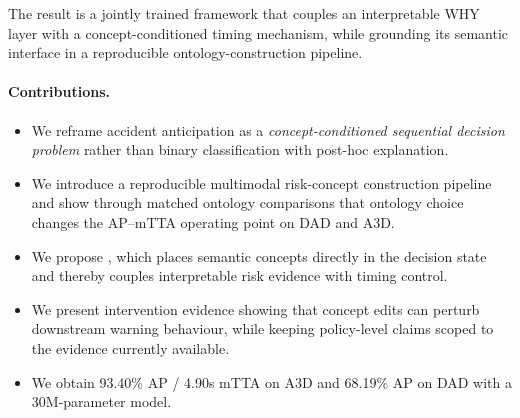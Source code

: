 The result is a jointly trained framework that couples an interpretable WHY
layer with a concept-conditioned timing mechanism, while grounding its semantic
interface in a reproducible ontology-construction pipeline.

\paragraph{Contributions.}
\begin{itemize}[leftmargin=1.4em,topsep=2pt,itemsep=1pt]
  \item We reframe accident anticipation as a \emph{concept-conditioned sequential decision problem} rather than binary classification with post-hoc explanation.
  \item We introduce a reproducible multimodal risk-concept construction pipeline and show through matched ontology comparisons that ontology choice changes the AP--mTTA operating point on DAD and A3D.
  \item We propose \method{}, which places semantic concepts directly in the decision state and thereby couples interpretable risk evidence with timing control.
  \item We present intervention evidence showing that concept edits can perturb downstream warning behaviour, while keeping policy-level claims scoped to the evidence currently available.
  \item We obtain 93.40\% AP / 4.90s mTTA on A3D and 68.19\% AP on DAD with a 30M-parameter model.
\end{itemize}
